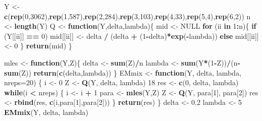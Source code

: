 \documentclass[]{article}
\newenvironment{Shaded}{\begin{snugshade}}{\end{snugshade}}
\newcommand{\ControlFlowTok}[1]{\textcolor[rgb]{0.13,0.29,0.53}{\textbf{#1}}}
\newcommand{\DataTypeTok}[1]{\textcolor[rgb]{0.13,0.29,0.53}{#1}}
\newcommand{\DecValTok}[1]{\textcolor[rgb]{0.00,0.00,0.81}{#1}}
\newcommand{\FloatTok}[1]{\textcolor[rgb]{0.00,0.00,0.81}{#1}}
\newcommand{\KeywordTok}[1]{\textcolor[rgb]{0.13,0.29,0.53}{\textbf{#1}}}
\newcommand{\NormalTok}[1]{#1}
\newcommand{\OperatorTok}[1]{\textcolor[rgb]{0.81,0.36,0.00}{\textbf{#1}}}
\newcommand{\OtherTok}[1]{\textcolor[rgb]{0.56,0.35,0.01}{#1}}
\newcommand{\StringTok}[1]{\textcolor[rgb]{0.31,0.60,0.02}{#1}}
\begin{document}
\begin{Shaded}
\begin{Highlighting}[]
\NormalTok{Y <-}\StringTok{ }\KeywordTok{c}\NormalTok{(}\KeywordTok{rep}\NormalTok{(}\DecValTok{0}\NormalTok{,}\DecValTok{3062}\NormalTok{),}\KeywordTok{rep}\NormalTok{(}\DecValTok{1}\NormalTok{,}\DecValTok{587}\NormalTok{),}\KeywordTok{rep}\NormalTok{(}\DecValTok{2}\NormalTok{,}\DecValTok{284}\NormalTok{),}\KeywordTok{rep}\NormalTok{(}\DecValTok{3}\NormalTok{,}\DecValTok{103}\NormalTok{),}\KeywordTok{rep}\NormalTok{(}\DecValTok{4}\NormalTok{,}\DecValTok{33}\NormalTok{),}\KeywordTok{rep}\NormalTok{(}\DecValTok{5}\NormalTok{,}\DecValTok{4}\NormalTok{),}\KeywordTok{rep}\NormalTok{(}\DecValTok{6}\NormalTok{,}\DecValTok{2}\NormalTok{))}
\NormalTok{n <-}\StringTok{ }\KeywordTok{length}\NormalTok{(Y)}
\NormalTok{Q <-}\StringTok{ }\ControlFlowTok{function}\NormalTok{(Y,delta,lambda)\{}
\NormalTok{mid <-}\StringTok{ }\OtherTok{NULL}
\ControlFlowTok{for}\NormalTok{ (ii }\ControlFlowTok{in} \DecValTok{1}\OperatorTok{:}\NormalTok{n)\{}
\ControlFlowTok{if}\NormalTok{ (Y[[ii]] }\OperatorTok{==}\StringTok{ }\DecValTok{0}\NormalTok{) mid[[ii]] <-}\StringTok{ }\NormalTok{delta }\OperatorTok{/}\StringTok{ }\NormalTok{(delta }\OperatorTok{+}\StringTok{ }\NormalTok{(}\DecValTok{1}\OperatorTok{-}\NormalTok{delta)}\OperatorTok{*}\KeywordTok{exp}\NormalTok{(}\OperatorTok{-}\NormalTok{lambda))}
\ControlFlowTok{else}\NormalTok{ mid[[ii]] <-}\StringTok{ }\DecValTok{0}
\NormalTok{\}}
\KeywordTok{return}\NormalTok{(mid)}
\NormalTok{\}}

\NormalTok{mles <-}\StringTok{ }\ControlFlowTok{function}\NormalTok{(Y,Z)\{}
\NormalTok{delta <-}\StringTok{ }\KeywordTok{sum}\NormalTok{(Z)}\OperatorTok{/}\NormalTok{n}
\NormalTok{lambda <-}\StringTok{ }\KeywordTok{sum}\NormalTok{(Y}\OperatorTok{*}\NormalTok{(}\DecValTok{1}\OperatorTok{-}\NormalTok{Z))}\OperatorTok{/}\NormalTok{(n}\OperatorTok{-}\KeywordTok{sum}\NormalTok{(Z))}
\KeywordTok{return}\NormalTok{(}\KeywordTok{c}\NormalTok{(delta,lambda))}
\NormalTok{\}}
\NormalTok{EMmix <-}\StringTok{ }\ControlFlowTok{function}\NormalTok{(Y, delta, lambda, }\DataTypeTok{nreps=}\DecValTok{20}\NormalTok{) \{}
\NormalTok{i <-}\StringTok{ }\DecValTok{0}
\NormalTok{Z <-}\StringTok{ }\KeywordTok{Q}\NormalTok{(Y, delta, lambda)}
\DecValTok{18}
\NormalTok{res <-}\StringTok{ }\KeywordTok{c}\NormalTok{(}\DecValTok{0}\NormalTok{, delta, lambda)}
\ControlFlowTok{while}\NormalTok{(i }\OperatorTok{<}\StringTok{ }\NormalTok{nreps) \{}
\NormalTok{i <-}\StringTok{ }\NormalTok{i }\OperatorTok{+}\StringTok{ }\DecValTok{1}
\NormalTok{para <-}\StringTok{ }\KeywordTok{mles}\NormalTok{(Y,Z)}
\NormalTok{Z <-}\StringTok{ }\KeywordTok{Q}\NormalTok{(Y, para[}\DecValTok{1}\NormalTok{], para[}\DecValTok{2}\NormalTok{])}
\NormalTok{res <-}\StringTok{ }\KeywordTok{rbind}\NormalTok{(res, }\KeywordTok{c}\NormalTok{(i,para[}\DecValTok{1}\NormalTok{],para[}\DecValTok{2}\NormalTok{]))}
\NormalTok{\}}
\KeywordTok{return}\NormalTok{(res)}
\NormalTok{\}}
\NormalTok{delta <-}\StringTok{ }\FloatTok{0.2}
\NormalTok{lambda <-}\StringTok{ }\DecValTok{5}
\KeywordTok{EMmix}\NormalTok{(Y, delta, lambda)}
\end{Highlighting}
\end{Shaded}
\end{document}
